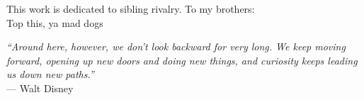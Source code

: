 \newpage\thispagestyle{empty}\mbox{}\newpage
\thispagestyle{empty}
\begin{center}
    \vspace*{5cm}

    \large
    This work is dedicated to sibling rivalry. To my brothers: \\
    Top this, ya mad dogs
    
\end{center}
\newpage

\thispagestyle{empty}
\begin{center}
    \vspace*{5cm}

   \large
    \emph{“Around here, however, we don’t look backward for very long. We keep moving forward, opening up new doors and doing new things, and curiosity keeps leading us down new paths.”} \\--- Walt Disney
    
\end{center}